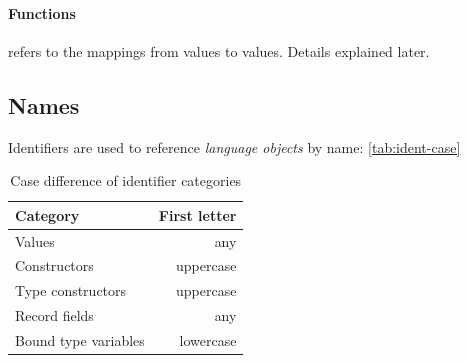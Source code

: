 \documentclass[a4paper, 11pt]{article}
\theoremstyle{remark}\newtheorem*{remark}{Remark}
\theoremstyle{definition}\newtheorem*{definition}{Definition}
\begin{document}
\paragraph*{Functions} refers to the mappings from values to values. Details explained later.

\subsection{Names}
Identifiers are used to reference \emph{language objects} by name: \autoref{tab:ident-case}
\begin{table}[]
  \centering
  \begin{tabular}{@{}lr@{}}
    \toprule
    Category             & First letter \\ \midrule
    Values               & any          \\
    Constructors         & uppercase    \\
    Type constructors    & uppercase    \\
    Record fields        & any          \\
    Bound type variables & lowercase    \\ \bottomrule
  \end{tabular}
  \caption{Case difference of identifier categories}\label{tab:ident-case}
\end{table}
\end{document}
